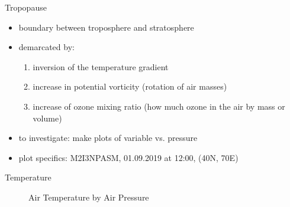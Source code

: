 \documentclass[
    hyperref={
        final,
        colorlinks=true,
        menucolor=black,
        anchorcolor=green,
        linkcolor=blue,
        citecolor=red,
        pdftitle={RS RAS Internship Presentation},
        pdfauthor={Moritz M. Konarski}
    }
]{beamer}
\begin{document}
\begin{frame}{Tropopause}
    \begin{itemize}
        \item boundary between troposphere and stratosphere
        \item demarcated by:
            \begin{enumerate}
                \item inversion of the temperature gradient \cite{tropopause}
                \item increase in potential vorticity (rotation of air masses)
                    \cite{tropopause}
                \item increase of ozone mixing ratio (how much ozone in the air
                    by mass or volume) \cite{atmosphere}
            \end{enumerate}
        \item to investigate: make plots of variable vs. pressure
        \item plot specifics: M2I3NPASM, 01.09.2019 at 12:00, 
            (40\textdegree{}N, 70\textdegree{}E)
    \end{itemize}
\end{frame}

\begin{frame}{Temperature}
\begin{figure}
    \vspace{-7pt}
    \caption{Air Temperature by Air Pressure}
    \label{t}
\end{figure}
\end{frame}
\end{document}
